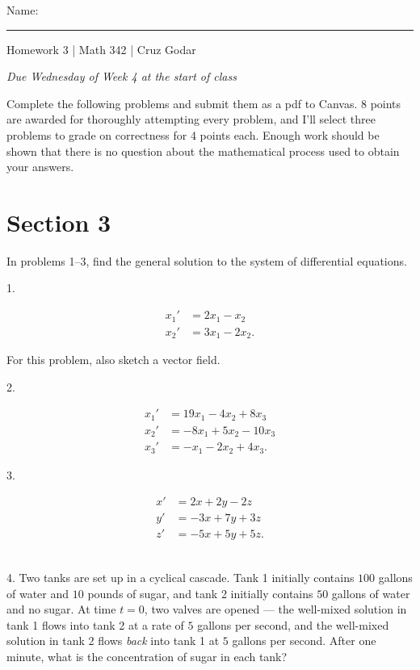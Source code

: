 \documentclass{article}
\begin{document}
\Large Name: \rule{2in}{0.15mm} \hfill Homework 3 | Math 342 | Cruz Godar \vspace{4pt} \normalsize

\textit{Due Wednesday of Week 4 at the start of class}

Complete the following problems and submit them as a pdf to Canvas. 8 points are awarded for thoroughly attempting every problem, and I'll select three problems to grade on correctness for 4 points each. Enough work should be shown that there is no question about the mathematical process used to obtain your answers.

\section{Section 3}

In problems 1--3, find the general solution to the system of differential equations.

1.

\begin{align*}
	x_1' &= 2x_1 - x_2\\
	x_2' &= 3x_1 - 2x_2.
\end{align*}

For this problem, also sketch a vector field.

2.

\begin{align*}
	x_1' &= 19x_1 - 4x_2 + 8x_3\\
	x_2' &= -8x_1 + 5x_2 - 10x_3\\
	x_3' &= -x_1 - 2x_2 + 4x_3.
\end{align*}

3.

\begin{align*}
	x' &= 2x + 2y - 2z\\
	y' &= -3x + 7y + 3z\\
	z' &= -5x + 5y + 5z.
\end{align*}

~\\

4. Two tanks are set up in a cyclical cascade. Tank 1 initially contains $100$ gallons of water and $10$ pounds of sugar, and tank 2 initially contains $50$ gallons of water and no sugar. At time $t = 0$, two valves are opened --- the well-mixed solution in tank 1 flows into tank 2 at a rate of $5$ gallons per second, and the well-mixed solution in tank 2 flows \textit{back} into tank 1 at $5$ gallons per second. After one minute, what is the concentration of sugar in each tank?
\end{document}
